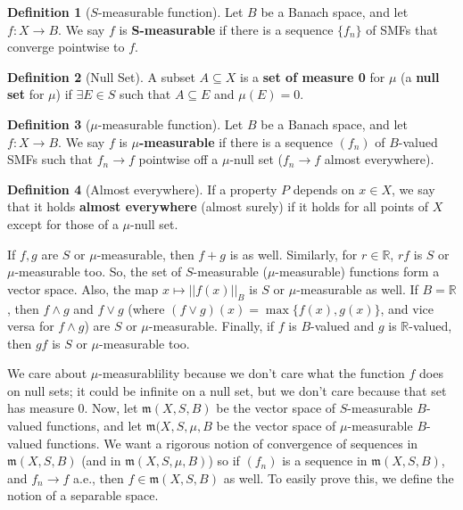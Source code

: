\documentclass[11pt, oneside]{amsart}   	%
\theoremstyle{definition}
\newtheorem{definition}{Definition}[section]
\begin{document}
	\begin{definition}[$S$-measurable function]
		Let $B$ be a Banach space, and let $f : X\rightarrow B$. We say $f$ is \textbf{S-measurable} if there is a sequence 
		$\{f_n\}$ of SMFs that converge pointwise to $f$. 
	\end{definition}
	
	\begin{definition}[Null Set]
		A subset $A\subseteq X$ is a \textbf{set of measure 0} for $\mu$ (a \textbf{null set} for $\mu$) if $\exists E\in S$ 
		such that $A\subseteq E$ and $\mu(E) = 0$. 
	\end{definition}
	
	\begin{definition}[$\mu$-measurable function]
		Let $B$ be a Banach space, and let $f : X\rightarrow B$. We say $f$ is \textbf{$\mu$-measurable} if there is a 
		sequence $(f_n)$ of $B$-valued SMFs such that $f_n\rightarrow f$ pointwise off a $\mu$-null set ($f_n\rightarrow 
		f$ almost everywhere).
	\end{definition}
	
	\begin{definition}[Almost everywhere]
		If a property $P$ depends on $x\in X$, we say that it holds \textbf{almost everywhere} (almost surely) if it holds 
		for all points of $X$ except for those of a $\mu$-null set.
	\end{definition}
	
	If $f, g$ are $S$ or $\mu$-measurable, then $f + g$ is as well. Similarly, for $r\in\mathbb R$, $rf$ is $S$ or 
	$\mu$-measurable too. So, the set of $S$-measurable ($\mu$-measurable) functions form a vector space. 
	Also, the map $x\mapsto ||f(x)||_B$ is $S$ or $\mu$-measurable as well. If $B = \mathbb R$, then $f\wedge g$ and 
	$f\vee g$ (where $(f\vee g)(x) = \max\{f(x), g(x)\}$, and vice versa for $f\wedge g$) are $S$ or $\mu$-measurable. 
	Finally, if $f$ is $B$-valued and $g$ is $\mathbb R$-valued, then $gf$ is $S$ or $\mu$-measurable too.
	
	We care about $\mu$-measurablility because we don't care what the function $f$ does on null sets; it could be infinite 
	on a null set, but we don't care because that set has measure $0$. Now, let $\mathfrak m(X, S, B)$ be the vector space 
	of $S$-measurable $B$-valued functions, and let $\mathfrak m(X, S, \mu, B$ be the vector space of $\mu$-measurable 
	$B$-valued functions. We want a rigorous notion of convergence of sequences in $\mathfrak m(X, S, B)$ (and in 
	$\mathfrak m(X, S, \mu, B)$) so if $(f_n)$ is a sequence in $\mathfrak m(X, S, B)$, and $f_n\rightarrow f$ a.e., then 
	$f\in \mathfrak m(X, S, B)$ as well. To easily prove this, we define the notion of a separable space.
	
\end{document}

